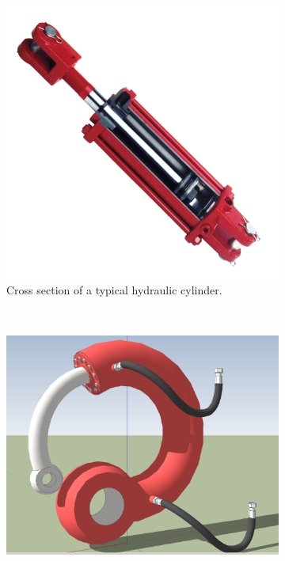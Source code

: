 \documentclass[11pt]{report}
\begin{document}
\begin{figure}
        \centering
        \begin{subfigure}[b]{0.3\textwidth}
                \includegraphics[width=\textwidth]{images/h_pump}
                \caption{Cross section of a typical hydraulic cylinder.}
                \label{fig:h_pump}
        \end{subfigure}%
        ~ %
        \begin{subfigure}[b]{0.3\textwidth}
                \includegraphics[width=\textwidth]{images/piston}

\end{subfigure}
\end{figure}
\end{document}
